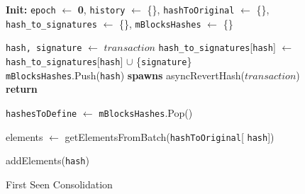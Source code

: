 \begin{figure}[t!]
  \begin{adjustbox}{minipage=[t]{\columnwidth}}
    \begin{algorithm}[H]
      \renewcommand{\thealgorithm}{ABCI Hashchain}         
      \caption{\small First Seen Consolidation}%
      \label{alg:abci-hash-first-seen}%
      \small
      \begin{algorithmic}[1]
            \State \textbf{Init:} \texttt{epoch} $\leftarrow$ \textbf{0}, \texttt{history} $\leftarrow$ \{\}, \texttt{hashToOriginal} $\leftarrow$ \{\}, \texttt{hash\_to\_signatures} $\leftarrow$ \{\}, \texttt{mBlocksHashes} $\leftarrow$ \{\}
      
            \label{alg4:deliver_tx}
            		\State \texttt{hash, signature} $\leftarrow$ $transaction$
            		\State \texttt{hash\_to\_signatures}[\texttt{hash}] $\leftarrow$ \texttt{hash\_to\_signatures}[\texttt{hash}] $\cup$  \{\texttt{signature}\}
					\State \texttt{mBlocksHashes}.Push(\texttt{hash}) 
            		\EndIf
            			\State \textbf{spawns} asyncRevertHash($transaction$)
                	\EndIf
                \State \textbf{return}
            \EndFunction
            
            		\State \texttt{hashesToDefine} $\leftarrow$ \texttt{mBlocksHashes}.Pop()
            				
            						\State elements $\leftarrow$ getElementsFromBatch(\texttt{hashToOriginal}[ \texttt{hash}])
            		
            						\State addElements(\texttt{hash})
            					\EndIf
            				\Else
            				\EndIf
					\Else
            			\EndIf
            		\EndFor
            \EndFunction
            
        \end{algorithmic}
      \end{algorithm}
	\end{adjustbox}
  \end{figure}

